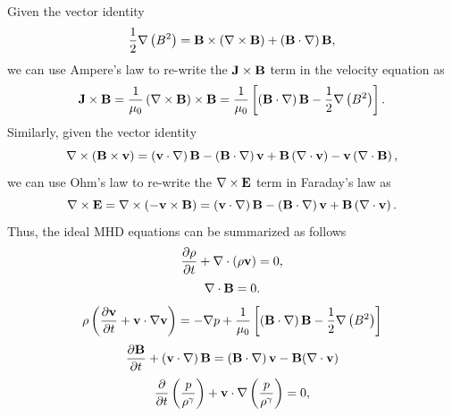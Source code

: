 \documentclass[a4paper,11pt]{report}
\begin{document}
Given the vector identity
\begin{equation}
    \frac{1}{2} \nabla \left ( B^2 \right ) = \mathbf{B} \times \left (\nabla \times \mathbf{B} \right ) + \left ( \mathbf{B} \cdot \nabla \right ) \mathbf{B},
\end{equation}
we can use Ampere's law to re-write the $\mathbf{J} \times \mathbf{B}$ term in the velocity equation as
\begin{equation}
    \mathbf{J} \times \mathbf{B} = \frac{1}{\mu_0} \left ( \nabla \times \mathbf{B} \right ) \times \mathbf{B} = \frac{1}{\mu_0} \left [ \left ( \mathbf{B} \cdot \nabla \right ) \mathbf{B} - \frac{1}{2} \nabla \left ( B^2 \right ) \right ].
\end{equation}
Similarly, given the vector identity
\begin{equation}
    \nabla \times \left ( \mathbf{B} \times \mathbf{v} \right ) = \left (\mathbf{v} \cdot \nabla \right ) \mathbf{B} - \left ( \mathbf{B} \cdot \nabla \right ) \mathbf{v} + \mathbf{B} \left ( \nabla \cdot \mathbf{v} \right ) - \mathbf{v} \left ( \nabla \cdot \mathbf{B} \right ),
\end{equation}
we can use Ohm's law to re-write the $\nabla \times \mathbf{E}$ term in Faraday's law as
\begin{equation}
    \nabla \times \mathbf{E} = \nabla \times (-\mathbf{v} \times \mathbf{B}) = \left (\mathbf{v} \cdot \nabla \right ) \mathbf{B} - \left ( \mathbf{B} \cdot \nabla \right ) \mathbf{v} + \mathbf{B} \left ( \nabla \cdot \mathbf{v} \right ).
\end{equation}
Thus, the ideal MHD equations can be summarized as follows
\begin{equation}
    \frac{\partial \rho}{\partial t} + \nabla \cdot (\rho \mathbf{v}) = 0,
\end{equation}
\begin{equation}
    \nabla \cdot \mathbf{B} = 0.
    \end{equation}
\begin{equation}
    \rho \left (\frac{\partial \mathbf{v}}{\partial t} + \mathbf{v} \cdot \nabla \mathbf{v} \right ) = - \nabla p  + \frac{1}{\mu_0} \left [ \left ( \mathbf{B} \cdot \nabla \right ) \mathbf{B} - \frac{1}{2} \nabla \left ( B^2 \right ) \right ]
\end{equation}
\begin{equation}
    \frac{\partial \mathbf{B}}{\partial t} + \left ( \mathbf{v} \cdot \nabla \right ) \mathbf{B} = \left ( \mathbf{B} \cdot \nabla \right ) \mathbf{v} - \mathbf{B} (\nabla \cdot \mathbf{v})
\end{equation}
\begin{equation}
    \frac{\partial}{\partial t} \left ( \frac{p}{\rho^\gamma} \right ) + \mathbf{v} \cdot \nabla \left (\frac{p}{\rho^\gamma} \right ) = 0,
\end{equation}
\end{document}
